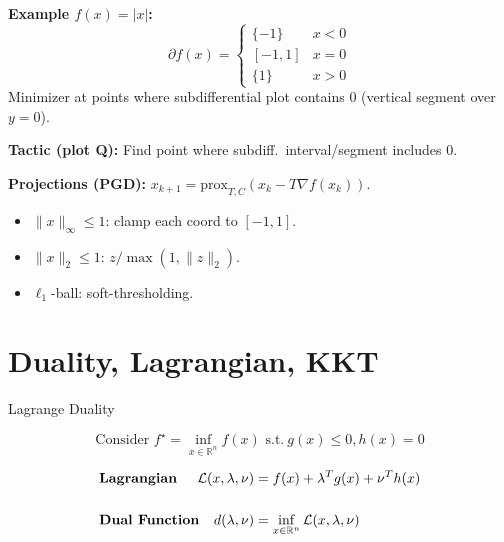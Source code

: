 \textbf{Example \(f(x)=|x|\):}
\[
  \partial f(x)=
  \begin{cases}
    \{-1\} & x<0\\
    [-1,1] & x=0\\
    \{1\} & x>0
  \end{cases}
\]
Minimizer at points where subdifferential plot contains \(0\)
(vertical segment over \(y=0\)).

\textbf{Tactic (plot Q):} Find point where subdiff.\ interval/segment
includes \(0\).

\textbf{Projections (PGD):} \(x_{k+1}=\mathrm{prox}_{T,C}(x_k-T\nabla f(x_k))\).
\begin{itemize}[leftmargin=*,itemsep=-1pt]
  \item \(\|x\|_\infty\le1\): clamp each coord to \([-1,1]\).
  \item \(\|x\|_2\le1\): \(z/\max(1,\|z\|_2)\).
  \item \(\ell_1\)-ball: soft-thresholding.
\end{itemize}

\section*{Duality, Lagrangian, KKT}

\begin{sstTitleBox}{
    Lagrange Duality
  }
  \begin{centering}
    \vspace{-1.5mm}
    \begin{equation}\text{Consider }
      f^\star = \inf_{x\in\mathcal{\mathbb{R}}^n}f(x)
      \text{ s.t.}\ g(x)\le0,h(x)=0
      \label{eq:dual}
    \end{equation}

    \begin{sstFullFrame}
      {\color{white}
        \vspace{-2mm}
        \[
          \begin{aligned}
            & \textbf{Lagrangian}
            & \hspace{-4mm}  \mathcal{L}(x,\lambda,\nu)
            & = f(x) + \lambda^T g(x)+\nu^T h(x)
            \\
            \\
            & \textbf{Dual Function}
            & \hspace{-4mm}    d(\lambda,\nu)            & = \inf_{x
            \in \mathcal{\mathbb{R}}^n}\mathcal{L}(x,\lambda,\nu)
        \end{aligned}\]
        \vspace{-2.7mm}
      }
    \end{sstFullFrame}
  \end{centering}
\end{sstTitleBox}

